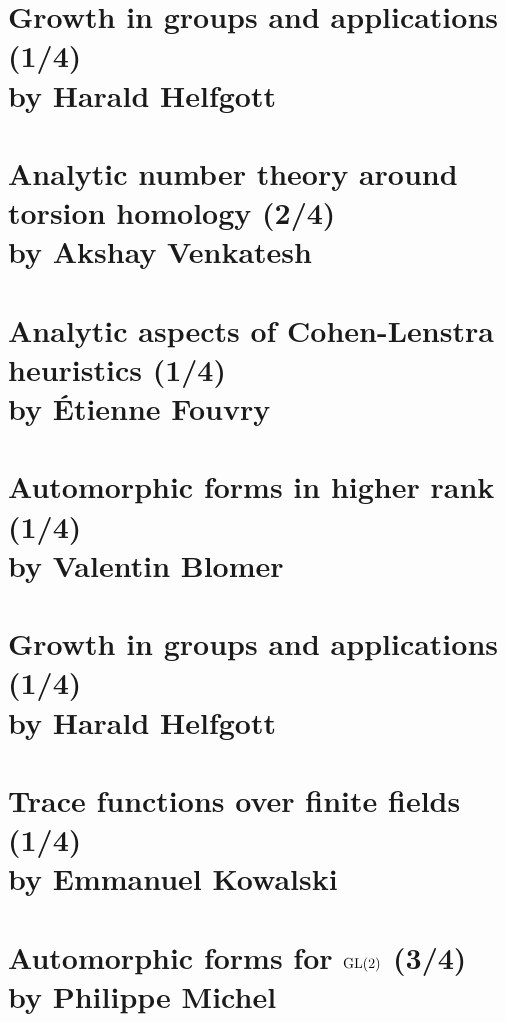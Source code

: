 \documentclass[12pt,amsfont]{amsart}
\begin{document}
\section{Growth in groups and applications (1/4)
\\ by Harald Helfgott}\label{20}

\newpage
\section{Analytic number theory around torsion homology (2/4) \\by Akshay Venkatesh}\label{21}

\begingroup
\renewcommand{\addcontentsline}[3]{}%
\endgroup


\newpage
\renewcommand{\thesubsection}{\arabic{section}.\arabic{subsection}}
\section{Analytic aspects of Cohen-Lenstra heuristics (1/4)
\\ by \'{E}tienne Fouvry}\label{2}


\newpage
\renewcommand{\thesubsection}{\arabic{section}.\arabic{subsection}}
\section{Automorphic forms in higher rank (1/4)
\\ by Valentin Blomer}\label{3}

\newpage
\renewcommand{\thesubsection}{\arabic{section}.\arabic{subsection}}
\section{Growth in groups and applications (1/4)
\\ by Harald Helfgott}\label{4}

\newpage
\renewcommand{\thesubsection}{\arabic{section}.\arabic{subsection}}
\section{Trace functions over finite fields
 (1/4)\\ by Emmanuel Kowalski}\label{5}

\newpage
\section{Automorphic forms for $\operatorname{GL}(2)$ (3/4)\\ by Philippe Michel}\label{1}
\end{document}
